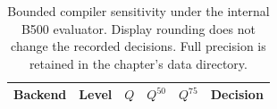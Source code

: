 \begin{table}[H]
\centering\small\TableSetup
\caption{Bounded compiler sensitivity under the internal B500 evaluator. Display rounding does not change the recorded decisions. Full precision is retained in the chapter's data directory.}
\label{tab:evaluation:yolov7_opt_sensitivity}
\begin{tabular}{@{}l c S[table-format=1.3] S[table-format=1.3] S[table-format=1.3] l@{}}
\toprule
Backend & Level & {$Q$} & {$Q^{50}$} & {$Q^{75}$} & Decision \\
\midrule
\bottomrule
\end{tabular}
\end{table}
